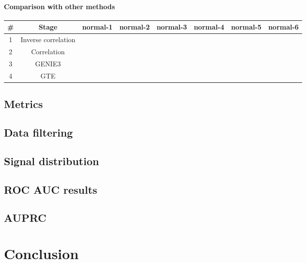 \documentclass[wcp]{jmlr}
\begin{document}
\paragraph{Comparison with other methods\\}
\begin{table}[h!]
\begin{tabular}{|c|c||c|c|c|c|c|c|} \hline
\# & Stage & normal-1 & normal-2 & normal-3 & normal-4 & normal-5 & normal-6 \\ \hline
1 & Inverse correlation & & & & &  &  \\ \hline
2 & Correlation & & & & &  &  \\ \hline
3 & GENIE3 & & & & &  &  \\ \hline
4 & GTE & & & & &  &  \\ \hline

\end{tabular}
\end{table}
\subsection{Metrics}
\subsection{Data filtering}
\subsection{Signal distribution}
\subsection{ROC AUC results}
\subsection{AUPRC}

\section{Conclusion}




\end{document}
